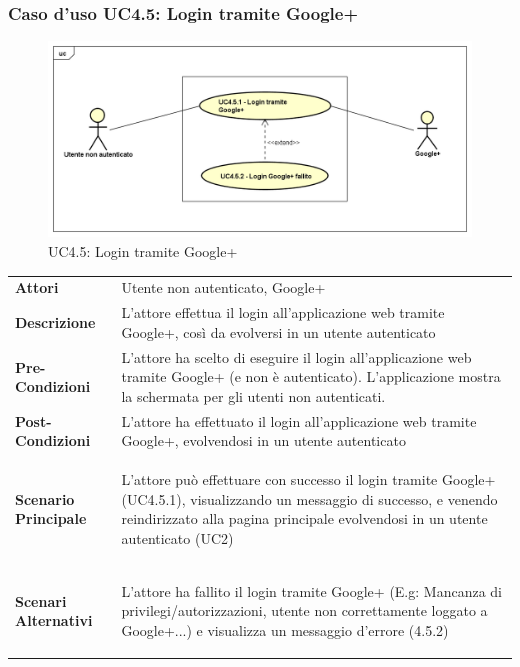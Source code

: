 \newpage
\subsubsection{Caso d'uso UC4.5: Login tramite Google+ }
\label{UC4_5}
\begin{figure}[!htbp]
	\centering
	\includegraphics[scale=0.45]{UML/UC4_5.png}
	\caption{UC4.5: Login tramite Google+}
\end{figure}

\begin{tabular}{ l | p{11cm}}
	\hline
	\rowcolor{Gray}
	\multicolumn{2}{c}{UC4.5 - Login tramite Google+} \\
	\hline
	\textbf{Attori} & Utente non autenticato, Google+ \\
	\textbf{Descrizione} & L'attore effettua il login all'applicazione web tramite Google+, così da evolversi in un utente autenticato \\
	\textbf{Pre-Condizioni} & L'attore ha scelto di eseguire il login all'applicazione web tramite Google+ (e non è autenticato). L'applicazione mostra la schermata per gli utenti non autenticati. \\
	\textbf{Post-Condizioni} & L'attore ha effettuato il login all'applicazione web tramite Google+, evolvendosi in un utente autenticato \\
	\textbf{Scenario Principale} & 
	\begin{enumerate*}[label=(\arabic*.),itemjoin={\newline}]
		\item L'attore può effettuare con successo il login tramite Google+ (UC4.5.1), visualizzando un messaggio di successo, e venendo reindirizzato alla pagina principale evolvendosi in un utente autenticato (UC2)
	\end{enumerate*}\\
	\textbf{Scenari Alternativi} & 
	\begin{enumerate*}[label=(\arabic*.),itemjoin={\newline}]
	\item L'attore ha fallito il login tramite Google+ (E.g: Mancanza di privilegi/autorizzazioni, utente non correttamente loggato a Google+...) e visualizza un messaggio d'errore (4.5.2)
	\end{enumerate*}\\
\end{tabular}